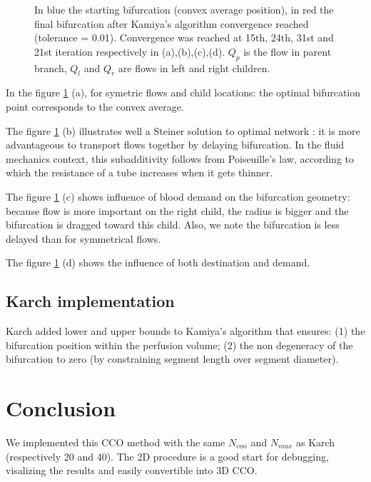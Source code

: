 \documentclass[a4paper, 11pt]{article} %
\begin{document}
\begin{figure}[!h]
\caption{In blue the starting bifurcation (convex average position), in red the final bifurcation after Kamiya's algorithm convergence reached (tolerance = 0.01). Convergence was reached at 15th, 24th, 31st and 21st iteration respectively in (a),(b),(c),(d). $Q_p$ is the flow in parent branch, $Q_l$ and $Q_r$ are flows in left and right children.}
\label{fig:generation}
\end{figure}

In the figure \ref{fig:generation} (a), for symetric flows and child locations: the optimal bifurcation point corresponds to the convex average.

The figure \ref{fig:generation} (b) illustrates well a Steiner solution to optimal network \cite{bernot2009optimal}: it is more advantageous to transport flows together by delaying bifurcation. In the fluid mechanics context, this subadditivity follows from Poiseuille's law, according to which the resistance of a tube increases when it gets thinner.

The figure \ref{fig:generation} (c) shows influence of blood demand on the bifurcation geometry: because flow is more important on the right child, the radius is bigger and the bifurcation is dragged toward this child. Also, we note the bifurcation is less delayed than for symmetrical flows.

The figure \ref{fig:generation} (d) shows the influence of both destination and demand.


\subsection*{Karch implementation}

Karch added lower and upper bounds to Kamiya's algorithm that ensures:
(1) the bifurcation position within the perfusion volume; (2)
the non degeneracy of the bifurcation to zero (by constraining segment length over segment diameter).



\section*{Conclusion}

We implemented this CCO method with the same $N_{con}$ and $N_{max}$ as Karch (respectively 20 and 40). The 2D procedure is a good start for debugging, visalizing the results and easily convertible into 3D CCO.
\end{document}

